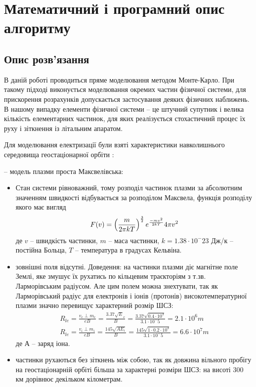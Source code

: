 \documentclass[a4paper,12pt]{article}
\begin{document}
\newpage

\section{Математичний і програмний опис алгоритму}
\subsection{Опис розв’язання}
В даній роботі проводиться пряме моделювання методом Монте-Карло. При такому підході виконується моделювання окремих частин фізичної системи, для прискорення розрахунків допускається застосування деяких фізичних наближень. В нашому випадку елементи фізичної системи -- це штучний супутник і велика кількість елементарних частинок, для яких реалізується стохастичний процес їх руху і зіткнення із літальним апаратом.

Для моделювання електризації були взяті характеристики навколишнього середовища геостаціонарної орбіти \cite{novikov}:

-- модель плазми проста Максвелівська:
\renewcommand{\labelitemi}{$\circ$}
\begin{itemize}
 \item Стан системи рівноважний, тому розподіл частинок плазми за абсолютним значенням швидкості відбувається за розподілом Максвела, функція розподілу якого має вигляд
\[
  F(v) = \left(\frac{m}{2 \pi k T}\right)^{3 \over 2} e^\frac{-mv^2}{2 k T} 4 \pi v^2
\]
 де $v$ -- швидкість частинки, $m$ -- маса частинки, $k = 1.38 \cdot 10^-23$ Дж/к -- постійна Больца, $T$ -- температура в градусах Кельвіна.
 \item зовнішні поля відсутні. Доведення: на частинки плазми діє магнітне поле Землі, яке змушує їх рухатись по кільцевим траєкторіям з т.зв. Ларморівським радіусом. Але цим полем можна знехтувати, так як Ларморівський радіус для електронів і іонів (протонів) високотемпературної плазми значно перевищує характерний розмір ШСЗ:
\begin{eqnarray}
 R_{le} = \frac{v_e \perp m_e}{eB} = \frac{3.37 \sqrt E_e}{B} = \frac{3.37 \sqrt {0.4 \cdot 10^3}}{3.1 \cdot 10^-5} = 2.1 \cdot 10^6 m \\
 R_{le} = \frac{v_i \perp m_i}{eB} = \frac{145 \sqrt {A E_i}}{B} = \frac{145 \sqrt {1 \cdot 0.2 \cdot 10^3}}{3.1 \cdot 10^-5} = 6.6 \cdot 10^7 m
\end{eqnarray}
де А -- заряд іона.
\item частинки рухаються без зіткнень між собою, так як довжина вільного пробігу на геостаціонарній орбіті більша за характерні розміри ШСЗ: на висоті 300 км дорівнює декільком кілометрам.
\end{itemize}
\end{document}
